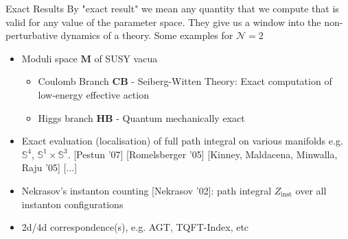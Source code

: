\documentclass{beamer}
\begin{document}
\begin{frame}{Exact Results}
By "exact result" we mean any quantity that we compute that is valid for any value of the parameter space. They give us a window into the non-perturbative dynamics of a theory. Some examples for $\mathcal{N}=2$
\begin{itemize}
      \item{Moduli space $\mathbf{M}$ of SUSY vacua
      \begin{itemize}
          \item Coulomb Branch $\textbf{CB}$ - Seiberg-Witten Theory: Exact computation of low-energy effective action
          \item Higgs branch $\mathbf{HB}$ - Quantum mechanically exact
      \end{itemize}}
          \item {
       Exact evaluation (localisation) of full path integral on various manifolds  e.g. $\mathbb{S}^4$, $\mathbb{S}^1\times\mathbb{S}^3$. \color{blue}[Pestun '07] [Romelsberger '05] [Kinney, Maldacena, Minwalla, Raju '05] [...]
      }
      \item{Nekrasov's instanton counting  \color{blue}[Nekrasov '02]\color{black}: path integral $Z_{\text{inst}}$ over all instanton configurations}
      \item{2d/4d correspondence(s), e.g. AGT, TQFT-Index, etc}
\end{itemize}
\begin{center}
\end{center}
\end{frame}
\end{document}
